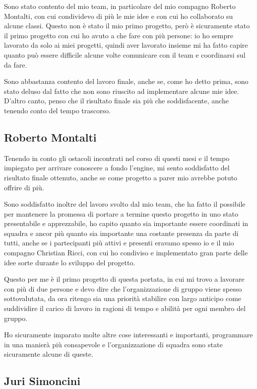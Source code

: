 \documentclass[a4paper,12pt]{report}
\begin{document}
Sono stato contento del mio team, in particolare del mio compagno Roberto Montalti, con cui condividevo di più le mie idee e con cui ho collaborato su alcune classi. Questo non è stato il mio primo progetto, però è sicuramente stato il primo progetto con cui ho avuto a che fare con più persone: io ho sempre lavorato da solo ai miei progetti, quindi aver lavorato insieme mi ha fatto capire quanto può essere difficile alcune volte comunicare con il team e coordinarsi sul da fare.

Sono abbastanza contento del lavoro finale, anche se, come ho detto prima, sono stato deluso dal fatto che non sono riuscito ad implementare alcune mie idee. D'altro canto, penso che il risultato finale sia più che soddisfacente, anche tenendo conto del tempo trascorso.

\subsection{Roberto Montalti}

Tenendo in conto gli ostacoli incontrati nel corso di questi mesi e il tempo impiegato per arrivare conoscere a fondo l'engine, mi sento soddisfatto del risultato finale ottenuto, anche se come progetto a parer mio avrebbe potuto offrire di più.

Sono soddisfatto inoltre del lavoro svolto dal mio team, che ha fatto il possibile per mantenere la promessa di portare a termine questo progetto in uno stato presentabile e apprezzabile, ho capito quanto sia importante essere coordinati in squadra e ancor più quanto sia importante una costante presenza da parte di tutti, anche se i partecipanti più attivi e presenti eravamo spesso io e il mio compagno Christian Ricci, con cui ho condiviso e implementato gran parte delle idee sorte durante lo sviluppo del progetto.   

Questo per me è il primo progetto di questa portata, in cui mi trovo a lavorare con più di due persone e devo dire che l'organizzazione di gruppo viene spesso sottovalutata, da ora ritengo sia una priorità stabilire con largo anticipo come suddividire il carico di lavoro in ragioni di tempo e abilità per ogni membro del gruppo.

Ho sicuramente imparato molte altre cose interessanti e importanti, programmare in una manierà più consapevole e l'organizzazione di squadra sono state sicuramente alcune di queste.

\subsection{Juri Simoncini}
\end{document}

